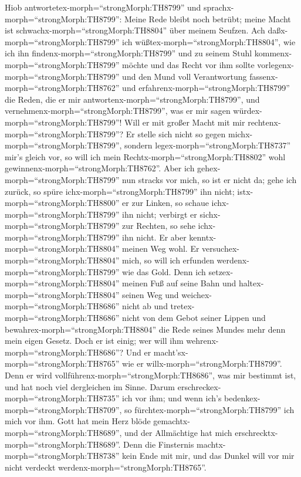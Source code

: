  Hiob antwortetex-morph=``strongMorph:TH8799'' und
sprachx-morph=``strongMorph:TH8799'':  Meine Rede bleibt
noch betrübt; meine Macht ist schwachx-morph=``strongMorph:TH8804'' über
meinem Seufzen.  Ach daßx-morph=``strongMorph:TH8799'' ich
wüßtex-morph=``strongMorph:TH8804'', wie ich ihn
findenx-morph=``strongMorph:TH8799'' und zu seinem Stuhl
kommenx-morph=``strongMorph:TH8799'' möchte  und das Recht
vor ihm sollte vorlegenx-morph=``strongMorph:TH8799'' und den Mund voll
Verantwortung fassenx-morph=``strongMorph:TH8762''  und
erfahrenx-morph=``strongMorph:TH8799'' die Reden, die er mir
antwortenx-morph=``strongMorph:TH8799'', und
vernehmenx-morph=``strongMorph:TH8799'', was er mir sagen
würdex-morph=``strongMorph:TH8799''!  Will er mit großer
Macht mit mir rechtenx-morph=``strongMorph:TH8799''? Er stelle sich
nicht so gegen michx-morph=``strongMorph:TH8799'',  sondern
legex-morph=``strongMorph:TH8737'' mir's gleich vor, so will ich mein
Rechtx-morph=``strongMorph:TH8802'' wohl
gewinnenx-morph=``strongMorph:TH8762''.  Aber ich
gehex-morph=``strongMorph:TH8799'' nun stracks vor mich, so ist er nicht
da; gehe ich zurück, so spüre ichx-morph=``strongMorph:TH8799'' ihn
nicht;  istx-morph=``strongMorph:TH8800'' er zur Linken, so
schaue ichx-morph=``strongMorph:TH8799'' ihn nicht; verbirgt er
sichx-morph=``strongMorph:TH8799'' zur Rechten, so sehe
ichx-morph=``strongMorph:TH8799'' ihn nicht.  Er aber
kenntx-morph=``strongMorph:TH8804'' meinen Weg wohl. Er
versuchex-morph=``strongMorph:TH8804'' mich, so will ich erfunden
werdenx-morph=``strongMorph:TH8799'' wie das Gold.  Denn
ich setzex-morph=``strongMorph:TH8804'' meinen Fuß auf seine Bahn und
haltex-morph=``strongMorph:TH8804'' seinen Weg und
weichex-morph=``strongMorph:TH8686'' nicht ab  und
tretex-morph=``strongMorph:TH8686'' nicht von dem Gebot seiner Lippen
und bewahrex-morph=``strongMorph:TH8804'' die Rede seines Mundes mehr
denn mein eigen Gesetz.  Doch er ist einig; wer will ihm
wehrenx-morph=``strongMorph:TH8686''? Und er
macht'sx-morph=``strongMorph:TH8765'' wie er
willx-morph=``strongMorph:TH8799''.  Denn er wird
vollführenx-morph=``strongMorph:TH8686'', was mir bestimmt ist, und hat
noch viel dergleichen im Sinne.  Darum
erschreckex-morph=``strongMorph:TH8735'' ich vor ihm; und wenn ich's
bedenkex-morph=``strongMorph:TH8709'', so
fürchtex-morph=``strongMorph:TH8799'' ich mich vor ihm. 
Gott hat mein Herz blöde gemachtx-morph=``strongMorph:TH8689'', und der
Allmächtige hat mich erschrecktx-morph=``strongMorph:TH8689''.
 Denn die Finsternis machtx-morph=``strongMorph:TH8738''
kein Ende mit mir, und das Dunkel will vor mir nicht verdeckt
werdenx-morph=``strongMorph:TH8765''.

